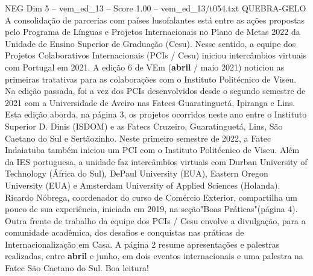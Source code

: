 \begin{textsample}{NEG Dim 5 – vem\_ed\_13 – Score 1.00 – vem\_ed\_13/t054.txt}  \label{ex:f5_neg_010}
QUEBRA-GELO A consolidação de parcerias com países lusofalantes está entre as ações propostas pelo Programa de Línguas e Projetos Internacionais no Plano de Metas 2022 da Unidade de Ensino Superior de Graduação (Cesu).
Nesse sentido, a equipe dos Projetos Colaborativos Internacionais (PCIs / Cesu) iniciou intercâmbios virtuais com Portugal em 2021.
A edição 6 de VEm (\textbf{abril} / maio 2021) noticiou as primeiras tratativas para as colaborações com o Instituto Politécnico de Viseu.
Na edição passada, foi a vez dos PCIs desenvolvidos desde o segundo semestre de 2021 com a Universidade de Aveiro nas Fatecs Guaratinguetá, Ipiranga e Lins.
Esta edição aborda, na página 3, os projetos ocorridos neste ano entre o Instituto Superior D.
Dinis (ISDOM) e as Fatecs Cruzeiro, Guaratinguetá, Lins, São Caetano do Sul e Sertãozinho.
Neste primeiro semestre de 2022, a Fatec Indaiatuba também iniciou um PCI com o Instituto Politécnico de Viseu.
Além da IES portuguesa, a unidade faz intercâmbios virtuais com Durban University of Technology (África do Sul), DePaul University (EUA), Eastern Oregon University (EUA) e Amsterdam University of Applied Sciences (Holanda).
Ricardo Nóbrega, coordenador do curso de Comércio Exterior, compartilha um pouco de sua experiência, iniciada em 2019, na seção"Boas Práticas"(página 4).
Outra frente de trabalho da equipe dos PCIs / Cesu envolve a divulgação, para a comunidade acadêmica, dos desafios e conquistas nas práticas de Internacionalização em Casa.
A página 2 resume apresentações e palestras realizadas, entre \textbf{abril} e junho, em dois eventos internacionais e uma palestra na Fatec São Caetano do Sul.
Boa leitura!

\end{textsample}
